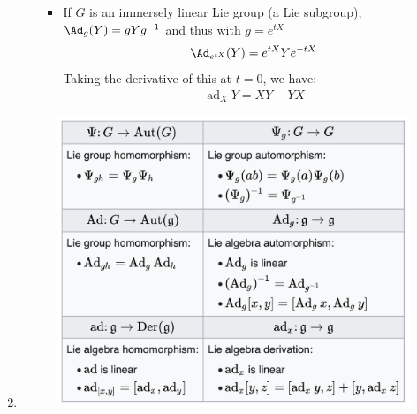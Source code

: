 \documentclass{article}
\begin{document}
\begin{enumerate}
\begin{itemize}
\begin{itemize}[$\ast$]
\item 
If $G$ is an immersely linear Lie group (a Lie subgroup), $\Ad_g(Y)=g Y g^{-1}$ and thus with $g=e^{t X}$
\begin{align*}
\Ad_{e^{t X}}(Y)=e^{t X} Y e^{-t X}
\end{align*}
Taking the derivative of this at $t=0$, we have:
\begin{align*}
\operatorname{ad}_X Y=X Y-Y X
\end{align*}

\end{itemize}
\end{itemize}

\item {}
\begin{figure}[H]
    \centering
    \includegraphics[scale=0.5]{Figs/adjoint.png}
\end{figure}

\end{enumerate}

















  
\end{document}
